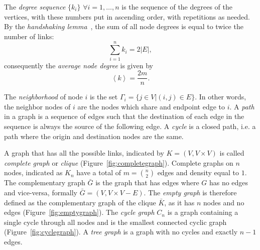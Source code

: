 The \emph{degree sequence} $\{k_i\}$ $\forall i=1,\ldots,n$ is the sequence  of the degrees of the vertices, with these numbers put in ascending order, with
repetitions as needed. By the \emph{handshaking lemma}~\cite{leiserson2001}, the sum of all node degrees is equal to twice the number of links:
\begin{equation}
\label{eq:handshaking_lemma}
\sum_{i=1}^n k_i=2 |E|,
\end{equation}
consequently the \emph{average node degree} is given by
\begin{equation}
\left< k \right> = \frac{2m}{n}.
\end{equation}

The \emph{neighborhood} of node $i$ is the set $\Gamma_i=\{j \in V | (i,j) \in E \}$. In other words, the neighbor nodes of $i$ are the nodes which share and endpoint edge to $i$. 
A \emph{path} in a graph is a sequence of edges such that the destination of each edge in the sequence is always the source of the following edge. A \emph{cycle} is a closed path, i.e. a path where the origin and destination nodes are the same.

A graph that has all the possible links, indicated by $K=(V,V\times V)$ is called \emph{complete graph} or \emph{clique} (Figure~\ref{fig:completegraph}). Complete graphs on $n$ nodes, indicated as $K_n$ have a total of $m=\binom{n}{2}$ edges and density equal to $1$.
The complementary graph $\bar{G}$ is the graph that has edges where $G$ has no edges and vice-versa, formally $\bar{G}=(V,V\times V - E)$.
The \emph{empty graph} is therefore defined as the complementary graph of the clique $\bar{K}$, as it has $n$ nodes and no edges (Figure~\ref{fig:emptygraph}). The \emph{cycle graph} $C_n$ is a graph containing a single cycle through all nodes and is the smallest connected cyclic graph (Figure~\ref{fig:cyclegraph}). A \emph{tree graph} is a graph with no cycles and exactly $n-1$ edges.

